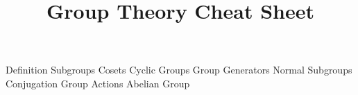 \documentclass[14pt]{extarticle}
\title{Group Theory Cheat Sheet}
\begin{document}
	\maketitle
	\begin{outline}		
		\1	Definition
		\1	Subgroups
		\1	Cosets
		\1	Cyclic Groups
		\1	Group Generators
		\1	Normal Subgroups
		\1	Conjugation
		\1	Group Actions
		\1	Abelian Group
	\end{outline}
\end{document}
